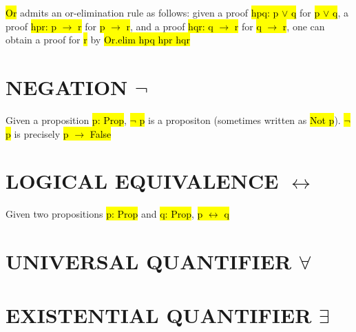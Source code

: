 \hl{Or} admits an or-elimination rule as follows: given a proof \hl{hpq: p $\lor$ q} for \hl{p $\lor$ q}, a proof \hl{hpr: p $\to$ r} for \hl{p $\to$ r}, and a proof \hl{hqr: q $\to$ r} for \hl{q $\to$ r}, one can obtain a proof for \hl{r} by \hl{Or.elim hpq hpr hqr}

\section{NEGATION $\lnot$}

Given a proposition \hl{p: Prop}, \hl{$\lnot$ p} is a propositon (sometimes written as \hl{Not p}). \hl{$\lnot$ p} is precisely \hl{p $\to$ False}

\section{LOGICAL EQUIVALENCE $\leftrightarrow$}

Given two propositions \hl{p: Prop} and \hl{q: Prop}, \hl{p $\leftrightarrow$ q}



\section{UNIVERSAL QUANTIFIER $\forall$}

\section{EXISTENTIAL QUANTIFIER $\exists$}

